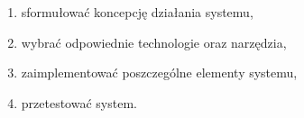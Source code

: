 \begin{enumerate}
    \item sformułować koncepcję działania systemu,
    \item wybrać odpowiednie technologie oraz narzędzia,
    \item zaimplementować poszczególne elementy systemu,
    \item przetestować system.
\end{enumerate}

